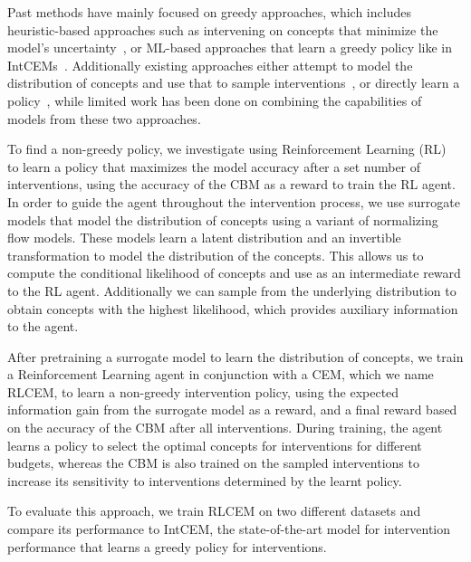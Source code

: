 Past methods have mainly focused on greedy approaches, which
includes heuristic-based approaches such as intervening on concepts that minimize the
model's uncertainty~\cite{coop}, or ML-based approaches that learn a greedy policy
like in IntCEMs~\cite{intcem}. Additionally existing approaches either 
attempt to model the distribution of concepts and use that
to sample interventions~\cite{energycem}, 
or directly learn a policy~\cite{intcem}, while limited
work has been done on combining the capabilities of models 
from these two approaches.

To find a non-greedy policy, we investigate using Reinforcement Learning (RL)~\cite{rl}
to learn a policy that maximizes
the model accuracy after a set number of interventions,
using the accuracy of the CBM as a reward to train the RL agent.
In order
to guide the agent throughout the intervention process,
we use surrogate models that model the distribution of concepts using
a variant of normalizing flow models. These models learn a latent distribution
and an invertible transformation to model the distribution of the concepts.
This allows us to compute the conditional likelihood of concepts 
and use as an intermediate reward to the RL agent. Additionally we can sample
from the underlying distribution to obtain concepts with the highest likelihood,
which provides auxiliary information to the agent.

After pretraining a surrogate model to learn the distribution of concepts,
we train a Reinforcement Learning agent in conjunction with a CEM, which we name RLCEM, to learn a 
non-greedy intervention policy, using
the expected information gain from the surrogate model
as a reward, and a final reward based on the 
accuracy of the CBM after all interventions.
During training,
the agent learns a policy to select
the optimal concepts for interventions for different budgets,
whereas the CBM is also trained on the sampled interventions
to increase its sensitivity to interventions determined by 
the learnt policy.

To evaluate this approach, we train RLCEM on two different datasets
and compare its performance to IntCEM, the state-of-the-art 
model for intervention performance that learns a greedy policy 
for interventions.


